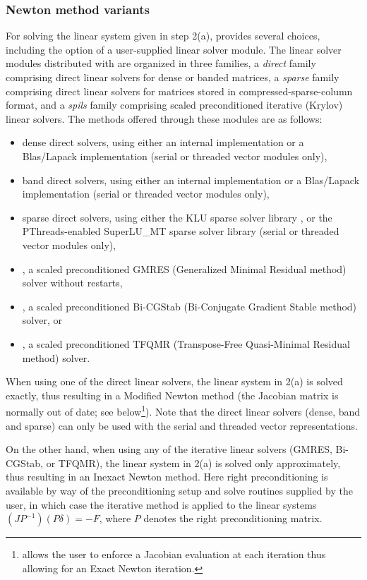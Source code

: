 
\subsubsection*{Newton method variants}
For solving the linear system given in step 2(a), {\kinsol} provides
several choices, including the option of a user-supplied
linear solver module. The linear solver modules distributed with {\sundials}
are organized in three families, a {\em direct} family comprising direct linear 
solvers for dense or banded matrices, a {\em sparse} family comprising
direct linear solvers for matrices stored in compressed-sparse-column
format, and a {\em spils} family comprising scaled preconditioned
iterative (Krylov) linear solvers. 
The methods offered through these modules are as follows:
\begin{itemize}
\item dense direct solvers, using either an internal implementation or 
  a Blas/Lapack implementation (serial or threaded vector modules only),
\item band direct solvers, using either an internal implementation or 
  a Blas/Lapack implementation (serial or threaded vector modules only),
\item sparse direct solvers, using either the KLU sparse solver
  library \cite{KLU_site}, or the PThreads-enabled SuperLU\_MT sparse
  solver library \cite{SuperLUMT_site} (serial or threaded vector modules only),
\item {\spgmr}, a scaled preconditioned GMRES (Generalized Minimal Residual method)
  solver without restarts,
\item {\spbcg}, a scaled preconditioned Bi-CGStab (Bi-Conjugate Gradient Stable
  method) solver, or
\item {\sptfqmr}, a scaled preconditioned TFQMR (Transpose-Free Quasi-Minimal
  Residual method) solver.
\end{itemize}
When using one of the direct linear solvers, the linear system in 2(a) is 
solved exactly, thus resulting in a Modified Newton method (the Jacobian matrix 
is normally out of date; see below\footnote{{\kinsol} allows the user to enforce 
a Jacobian evaluation at each iteration thus allowing for an Exact Newton iteration.}). 
Note that the direct linear solvers (dense, band and sparse) can only
be used with the serial and threaded vector representations.

On the other hand, when using any of the iterative linear solvers
(GMRES, Bi-CGStab, or TFQMR), the linear system in 2(a) is solved only
approximately, thus resulting in an Inexact Newton method.  Here right
preconditioning is available by way of the preconditioning setup and
solve routines supplied by the user, in which case the iterative
method is applied to the linear systems $(JP^{-1})(P\delta) = -F$,
where $P$ denotes the right preconditioning matrix.

